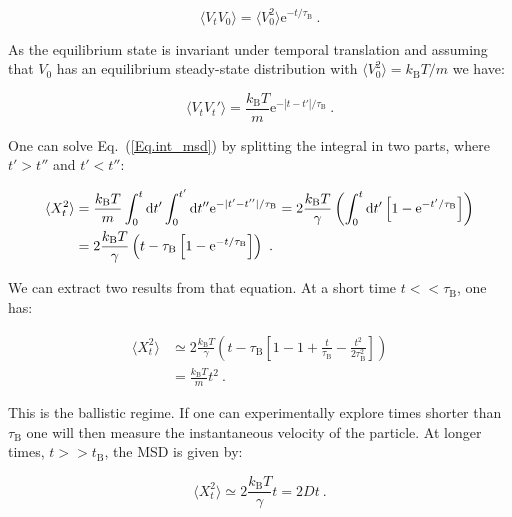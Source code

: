 \begin{equation}
	\langle V_t V_0 \rangle = \langle V_0 ^2 \rangle \mathrm{e}^{-t/\tau_{\mathrm{B}}}~.
\end{equation}

As the equilibrium state is invariant under temporal translation and assuming that $V_0$ has an equilibrium steady-state distribution with $\langle V_0^2 \rangle = k_\mathrm{B} T / m$ we have:

\begin{equation}
	\langle V_t V_t' \rangle = \frac{k_\mathrm{B}T}{m} \mathrm{e}^{-|t-t'|/\tau_{\mathrm{B}}}~.
\end{equation}

One can solve Eq.~(\ref{Eq.int_msd}) by splitting the integral in two parts, where $t'>t''$ and $ t' < t''$:

\begin{equation}
	\begin{aligned}
		\langle X_t ^2 \rangle & =    \frac{k_\mathrm{B}T}{m}  \int _0 ^t \textnormal{d}t' \int _0 ^{t'} \textnormal{d}t'' \mathrm{e} ^ {- |t' - t''| / \tau_\mathrm{B}} = 2 \frac{k_\mathrm{B}T}{\gamma} \left( \int_0 ^t \textnormal{d}t' \left[1 - \mathrm{e}^{-t'/\tau_\mathrm{B}} \right] \right) \\
		& = 2 \frac{k_\mathrm{B} T}{\gamma} \left( t - \tau_\mathrm{B} \left[ 1 - \mathrm{e}^{-t/\tau_\mathrm{B}} \right] \right) ~.
	\end{aligned}
\end{equation}

We can extract two results from that equation. At a short time $t << \tau_\mathrm{B}$, one has:

\begin{equation}
	\begin{aligned}
		\langle X_t ^2 \rangle & \simeq  2 \frac{k_\mathrm{B} T}{\gamma} \left( t - \tau_\mathrm{B} \left[ 1 - 1 + \frac{t}{\tau_\mathrm{B}} - \frac{t^2}{ 2 \tau_\mathrm{B} ^2}\right]         \right) \\
		& = \frac{k_\mathrm{B} T}{m} t^2 ~.
	\end{aligned}
	\label{Eq.shorttimemsd}
\end{equation}

This is the ballistic regime. If one can experimentally explore times shorter than $\tau _ \mathrm{B} $ one will then measure the instantaneous velocity of the particle. At longer times, $t >> t_\mathrm{B}$, the \gls{MSD} is given by:

\begin{equation}
	\langle X_t ^2 \rangle \simeq 2 \frac{k_\mathrm{B}T}{\gamma} t = 2Dt ~.
	\label{eq:longtimemsd}
\end{equation}

